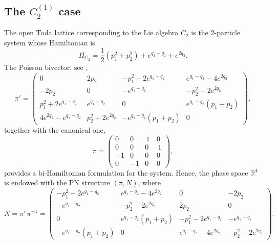 \documentclass[12pt]{article}
\newcommand{\RR}{{{\mathbb{R}}}}
\begin{document}
\subsection{The $C^{(1)}_2$ case}\label{ss:C2} 
The open Toda lattice corresponding to the Lie algebra $C_2$ 
is the 2-particle %
system whose Hamiltonian is
\[
H_{C_2}=\frac{1}{2}(p_1^2+p_2^2)+e^{q_1-q_2}+e^{2q_2}.
\]
The Poisson bivector, see \cite{daCosta-Damianou},
\begin{equation}
{\pi'}%
=\left( \begin {array}{cc|cc} 
    0 & 2p_2 & -p_1^2-2e^{q_1-q_2} & e^{q_1-q_2}-4e^{2q_2}\\
    -2p_2 & 0 & -e^{q_1-q_2} & -p_2^2-2e^{2q_2}\\
    \hline
    p_1^2+2e^{q_1-q_2} & e^{q_1-q_2} & 0 & e^{q_1-q_2}(p_1+p_2)\\
    4e^{2q_2}-e^{q_1-q_2} & p_2^2+2e^{2q_2} & -e^{q_1-q_2}(p_1+p_2) & 0 
\end{array}\right)
\label{eq: C2 Poisson tensor},    
\end{equation}
together with the canonical one, %
\begin{equation*} 
\pi%
=\left( \begin {array}{cc|cc} 
0&0&\,1\, &0\\ %
0&0&0&\,1\\ %
\hline
-1&0&0&0\\ %
0&-1&0&0
\end{array}\right),
\end{equation*}
provides a bi-Hamiltonian formulation for the system. Hence, the phase space $\RR^4$ %
is endowed with the PN structure $(\pi,N)$, where %
\begin{equation}
{N}=%
{\pi'}\,%
\pi%
^{-1}=
\left( \begin {array}{cc|cc}
-p_1^2-2e^{q_1-q_2} & e^{q_1-q_2}-4e^{2q_2} & 0 & -2p_2\\
-e^{q_1-q_2} & -p_2^2-2e^{2q_2} & 2p_2 & 0\\
\hline
0 & e^{q_1-q_2}(p_1+p_2) & -p_1^2-2e^{q_1-q_2} & -e^{q_1-q_2}\\
-e^{q_1-q_2}(p_1+p_2) & 0 & e^{q_1-q_2}-4e^{2q_2} & -p_2^2-2e^{2q_2}
\end{array}\right).
\label{eq: open C2 (1,1) tensor}
\end{equation}
\end{document}
